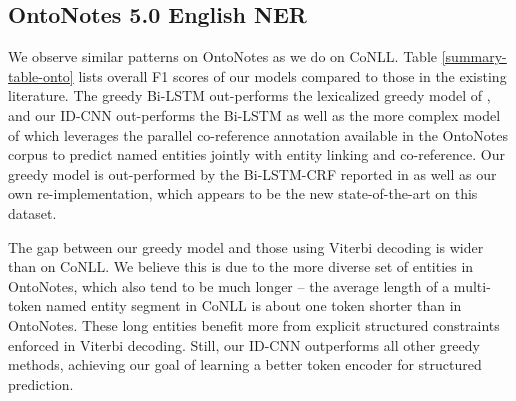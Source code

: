 \documentclass[11pt,letterpaper]{article}
\begin{document}
\subsection{OntoNotes 5.0 English NER}

We observe similar patterns on OntoNotes as we do on CoNLL. Table \ref{summary-table-onto} lists overall F1 scores of our models compared to those in the existing literature. The greedy Bi-LSTM out-performs the lexicalized greedy model of \citet{ratinov2009design}, and our ID-CNN out-performs the Bi-LSTM as well as the more complex model of \citet{durrett2014joint} which leverages the parallel co-reference annotation available in the OntoNotes corpus to predict named entities jointly with entity linking and co-reference. Our greedy model is out-performed by the Bi-LSTM-CRF reported in \citet{chiu2016named} as well as our own re-implementation, which appears to be the new state-of-the-art on this dataset. 

\begin{table}
  \caption{F1 score of sentence and document models on OntoNotes.\label{summary-table-onto}}
\end{table}

The gap between our greedy model and those using Viterbi decoding is wider than on CoNLL. We believe this is due to the more diverse set of entities in OntoNotes, which also tend to be much longer -- the average length of a multi-token named entity segment in CoNLL is about one token shorter than in OntoNotes. These long entities benefit more from explicit structured constraints enforced in Viterbi decoding. Still, our ID-CNN outperforms all other greedy methods, achieving our goal of learning a better token encoder for structured prediction.
\end{document}
